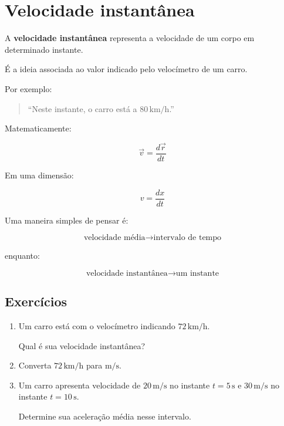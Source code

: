 \documentclass[a4paper,12pt]{article}
\begin{document}
\section{Velocidade instantânea}

\begin{ideia}

A \textbf{velocidade instantânea} representa a velocidade de um
corpo em determinado instante.

É a ideia associada ao valor indicado pelo velocímetro de um carro.

Por exemplo:

\begin{quote}
``Neste instante, o carro está a $80\,\text{km/h}$.''
\end{quote}

Matematicamente:

\[
\boxed{
\vec v=
\frac{d\vec r}{dt}
}
\]

Em uma dimensão:

\[
\boxed{
v=
\frac{dx}{dt}
}
\]

\end{ideia}


\begin{atencao}

Uma maneira simples de pensar é:

\[
\boxed{
\text{velocidade média}
\rightarrow
\text{intervalo de tempo}
}
\]

enquanto:

\[
\boxed{
\text{velocidade instantânea}
\rightarrow
\text{um instante}
}
\]

\end{atencao}


\subsection*{Exercícios}

\begin{enumerate}

\item Um carro está com o velocímetro indicando
$72\,\text{km/h}$.

Qual é sua velocidade instantânea?

\vspace{1.5cm}


\item Converta $72\,\text{km/h}$ para $\text{m/s}$.

\vspace{1.5cm}


\item Um carro apresenta velocidade de $20\,\text{m/s}$ no instante
$t=5\,\text{s}$ e $30\,\text{m/s}$ no instante $t=10\,\text{s}$.

Determine sua aceleração média nesse intervalo.

\vspace{1.5cm}

\end{enumerate}
\end{document}
